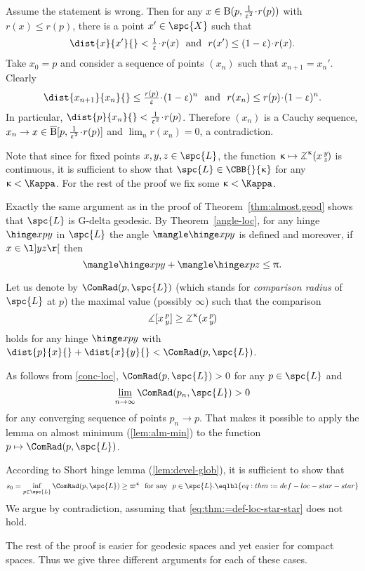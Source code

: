 Assume the statement is wrong. 
Then for any $x\in \oBall(p,\tfrac{1}{\eps^2}\cdot r(p))$ with $r(x)\le r(p)$, there is a point $x'\in \spc{X}$ such that 
\[\dist{x}{x'}{}<\tfrac{1}\eps\cdot r(x)
\ \ \text{and}\ \ 
r(x')\le (1-\eps)\cdot r(x).\]
Take $x_0=p$ and consider a sequence of points $(x_n)$ such that $x_{n+1}=x_n'$.
Clearly 
\[\dist{x_{n+1}}{x_n}{}
\le
\tfrac{r(p)}{\eps}\cdot(1-\eps)^n
\ \ \hbox{and}\ \ 
r(x_n)\le r(p)\cdot(1-\eps)^n.\] 
In particular, $\dist{p}{x_n}{}<\tfrac{1}{\eps^2}\cdot r(p)$.
Therefore $(x_n)$ is a Cauchy sequence,
$x_n\to x\in \cBall[p,\tfrac{1}{\eps^2}\cdot r(p)]$
and
$\lim_{n}r(x_n)=0$, a contradiction.
\qeds




Note that since for fixed points $x,y,z\in \spc{L}$, 
the function $\kappa\mapsto\angk\kappa x y z$ is continuous, 
it is sufficient to show that $\spc{L}\in\CBB{}{\kappa}$ 
for any $\kappa<\Kappa$.
For the rest of the proof we fix some $\kappa<\Kappa$.

Exactly the same argument as in the proof of Theorem~\ref{thm:almost.geod} 
shows that $\spc{L}$ is G-delta geodesic.
By Theorem~\ref{angle-loc}, 
for any hinge $\hinge x p y$ in $\spc{L}$ the angle $\mangle\hinge x p y$ is defined 
and moreover, if $x\in \l]y z\r[$ then
\[\mangle\hinge x p y+\mangle\hinge x p z\le \pi.\] 

Let us denote by $\ComRad(p,\spc{L})$ 
(which stands for \emph{comparison radius} of $\spc{L}$ at $p$) 
the maximal value (possibly $\infty$) such that the comparison 
\[\mangle\hinge x p y
\ge\angk\kappa x p y\]
holds for any hinge $\hinge x p y$ with $\dist{p}{x}{}+\dist{x}{y}{}< \ComRad(p,\spc{L})$.

As follows from \ref{conc-loc}, $\ComRad(p,\spc{L})>0$ for any $p\in\spc{L}$ and 
$$\liminf_{n\to\infty}\ComRad(p_n,\spc{L})>0$$ 
for any converging sequence of points $p_n\to p$.
That makes it possible to apply the lemma on almost minimum (\ref{lem:alm-min}) to the function $p\mapsto \ComRad(p,\spc{L})$.

According to Short hinge lemma (\ref{lem:devel-glob}), it is sufficient  to show that 
\[s_0=\inf_{p\in\spc{L}}\ComRad(p,\spc{L})
\ge \varpi\kappa\ \ 
\text{for any}\ \ 
p\in \spc{L}.
\eqlbl{eq:thm:=def-loc-star-star}\]
We argue by contradiction, assuming that  \ref{eq:thm:=def-loc-star-star} does not hold.

The rest of the proof is easier for geodesic spaces 
and yet easier for compact spaces.
Thus we give three different arguments  for each of these cases.

